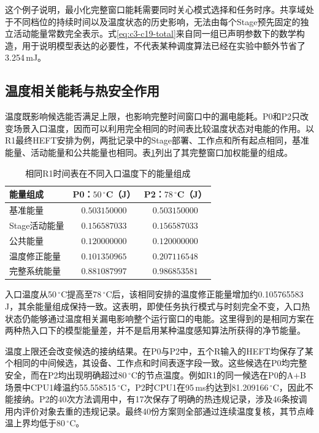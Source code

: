 这个例子说明，最小化完整窗口能耗需要同时关心模式选择和任务时序。共享域处于不同档位的持续时间以及温度状态的历史影响，无法由每个Stage预先固定的独立活动能量常数完全表示。式\eqref{eq:c3-c19-total}来自同一组已声明参数下的数学构造，用于说明模型表达的必要性，不代表某种调度算法已经在实验中额外节省了3.254\,mJ。


\subsection{温度相关能耗与热安全作用}

温度既影响候选能否满足上限，也影响完整时间窗口中的漏电能耗。P0和P2只改变场景入口温度，因而可以利用完全相同的时间表比较温度状态对电能的作用。以R1最终HEFT安排为例，两批记录中的Stage部署、工作点和所有起点相同，基准能量、活动能量和公共能量也相同。表\ref{tab:c3-temp-energy}列出了其完整窗口加权能量的组成。

\begin{table}[htbp]
 \centering
 \caption{相同R1时间表在不同入口温度下的能量组成}
 \label{tab:c3-temp-energy}
 \begin{tabular}{lcc}
 \toprule
 能量组成 & P0：$50\,^\circ$C（J） & P2：$78\,^\circ$C（J）\\
 \midrule
 基准能量 & $0.503150000$ & $0.503150000$\\
 Stage活动能量 & $0.156587033$ & $0.156587033$\\
 公共能量 & $0.120000000$ & $0.120000000$\\
 温度修正能量 & $0.101350965$ & $0.207116548$\\
 \midrule
 完整系统能量 & $0.881087997$ & $0.986853581$\\
 \bottomrule
 \end{tabular}
\end{table}

入口温度从50\,$^\circ$C提高至78\,$^\circ$C后，该相同安排的温度修正能量增加约0.105765583\,J，其余能量组成保持一致。这表明，即使任务执行模式与时刻完全不变，入口热状态仍能够通过温度相关漏电影响整个运行窗口的电能。这里得到的是相同方案在两种热入口下的模型能量差，并不是启用某种温度感知算法所获得的净节能量。

温度上限还会改变候选的接纳结果。在P0与P2中，五个R输入的HEFT均保存了某个相同的中间候选，其设备、工作点和时间表逐字段一致。这些候选在P0均完整安全，而在P2均出现明确超过80\,$^\circ$C的节点温度。例如R1的同一候选在P0的A+B场景中CPU1峰温约55.558515\,$^\circ$C，P2时CPU1在95\,ms约达到81.209166\,$^\circ$C，因此不能接纳。P2的40次方法调用中，有17次保存了明确的热违规记录，涉及46条按调用内评价对象去重的违规记录。最终40份方案则全部通过连续温度复核，其节点峰温上界均低于80\,$^\circ$C。

